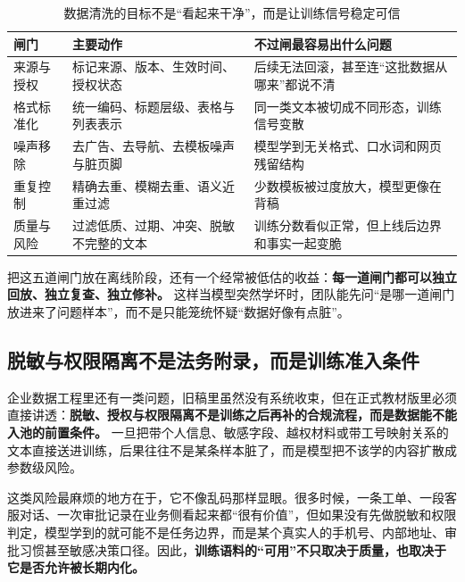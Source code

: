 \begin{table}[H]
\centering
\small
\begin{tabularx}{\textwidth}{>{\raggedright\arraybackslash}p{2.9cm}>{\raggedright\arraybackslash}p{3.2cm}>{\raggedright\arraybackslash}X}
\toprule
\textbf{闸门} & \textbf{主要动作} & \textbf{不过闸最容易出什么问题} \\
\midrule
来源与授权 & 标记来源、版本、生效时间、授权状态 & 后续无法回滚，甚至连“这批数据从哪来”都说不清 \\
格式标准化 & 统一编码、标题层级、表格与列表表示 & 同一类文本被切成不同形态，训练信号变散 \\
噪声移除 & 去广告、去导航、去模板噪声与脏页脚 & 模型学到无关格式、口水词和网页残留结构 \\
重复控制 & 精确去重、模糊去重、语义近重过滤 & 少数模板被过度放大，模型更像在背稿 \\
质量与风险 & 过滤低质、过期、冲突、脱敏不完整的文本 & 训练分数看似正常，但上线后边界和事实一起变脆 \\
\bottomrule
\end{tabularx}
\caption{数据清洗的目标不是“看起来干净”，而是让训练信号稳定可信}
\label{tab:data-cleaning-gates}
\end{table}

把这五道闸门放在离线阶段，还有一个经常被低估的收益：\textbf{每一道闸门都可以独立回放、独立复查、独立修补。} 这样当模型突然学坏时，团队能先问“是哪一道闸门放进来了问题样本”，而不是只能笼统怀疑“数据好像有点脏”。

\subsection{脱敏与权限隔离不是法务附录，而是训练准入条件}
企业数据工程里还有一类问题，旧稿里虽然没有系统收束，但在正式教材版里必须直接讲透：\textbf{脱敏、授权与权限隔离不是训练之后再补的合规流程，而是数据能不能入池的前置条件。} 一旦把带个人信息、敏感字段、越权材料或带工号映射关系的文本直接送进训练，后果往往不是某条样本脏了，而是模型把不该学的内容扩散成参数级风险。

这类风险最麻烦的地方在于，它不像乱码那样显眼。很多时候，一条工单、一段客服对话、一次审批记录在业务侧看起来都“很有价值”，但如果没有先做脱敏和权限判定，模型学到的就可能不是任务边界，而是某个真实人的手机号、内部地址、审批习惯甚至敏感决策口径。因此，\textbf{训练语料的“可用”不只取决于质量，也取决于它是否允许被长期内化。}

